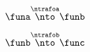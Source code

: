{\begin{forslides}



    \begin{equation}\label{eq:ex_nt_13}
        \funa \overset{\ntrafoa}{\nto} \funb
    \end{equation}

    \begin{equation}\label{eq:ex_nt_14}
        \funb  \overset{\ntrafob}{\nto} \func
    \end{equation}


\end{forslides}}
